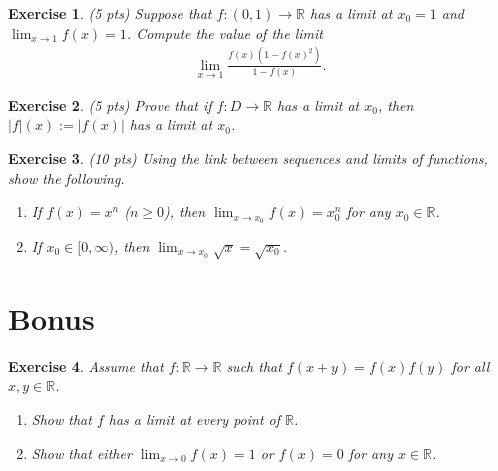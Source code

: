 \documentclass[12pt]{article}
\newcommand{\bR}{\mathbb{R}}
\newcommand{\ra}{\rightarrow}
\theoremstyle{plain}
\newtheorem{exer}{\textbf{Exercise}}}
\theoremstyle{plain}
\begin{document}
\begin{exer}
(5 pts)
Suppose that $f: (0, 1) \ra \bR$ has a limit at $x_0 = 1$ and $\lim_{x \ra 1} f(x) = 1$. Compute the value of the limit
	\begin{align*}
	\lim_{x \ra 1} \frac{f(x) (1 - f(x)^2)}{1 - f(x)} .
	\end{align*}
\end{exer}

\begin{exer}
(5 pts)
Prove that if $f: D \ra \bR$ has a limit at $x_0$, then $|f|(x) := |f(x)|$ has a limit at $x_0$.
\end{exer}

\begin{exer}
(10 pts)
Using the link between sequences and limits of functions, show the following.
	\begin{enumerate}[label=\textbf{\alph*)}]
	\item If $f(x) = x^n$ ($n \geq 0$), then $\lim_{x \ra x_0} f(x) = x_0^n$ for any $x_0 \in \bR$.
	\item If $x_0 \in [0, \infty )$, then $\lim_{x \ra x_0} \sqrt{x} = \sqrt{x_0}$.
\end{enumerate}	 
\end{exer}

\section{Bonus}
\begin{exer}
Assume that $f : \bR \ra \bR$ such that $f(x + y) = f(x) f(y)$ for all $x, y \in \bR$.
	\begin{enumerate}[label=\textbf{\alph*)}]
	\item Show that $f$ has a limit at every point of $\bR$.
	\item Show that either $\lim_{x \ra 0} f(x) = 1$ or $f(x) = 0$ for any $x \in \bR$.
	\end{enumerate}
\end{exer}
\end{document}
